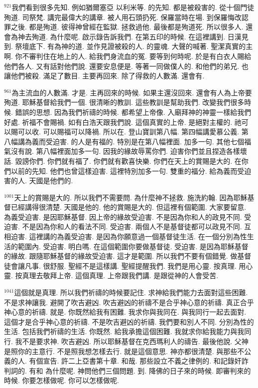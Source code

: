 \documentclass{book}
\begin{document}
$^{921}$我們看到很多先知.
例如猶爾塞亞 以利米等.
的先知.
都是被殺害的.
從十個門徒殉道.
司祭梵.
講完最偉大的講章.
被人用石頭扔死.
保羅當時在場.
到保羅悔改認罪之後.
都是殉道.
彼得神曾經在監獄.
拯救過他.
最後都是殉道死.
所以很多人.
還會為神去殉道.
為什麼呢.
啟示錄告訴我們.
在第五印的時候.
在這裡講到.
日漢見到.
祭壇底下.
有為神的道.
並作見證被殺的人.
的靈魂.
大聲的喊著.
聖潔真實的主啊.
你不審判住在地上的人.
給我們身流血的冤.
要等到何時呢.
於是有白衣人賜給他們各人.
又有話對他們說.
還要安息便是.
等著一同做僕人的.
和他們的弟兄.
也讓他們被殺.
滿足了數目.
主要再回來.
除了得救的人數滿.
還會有.

$^{961}$為主流血的人數滿.
才是.
主再回來的時候.
如果主還沒回來.
還會有人為上帝要殉道.
耶穌基督給我們一個.
很清晰的教訓.
這些教訓是幫助我們.
改變我們很多時候.
錯誤的思想.
因為我們祈禱的時候.
都希望上帝像.
入廟拜神的神靈一樣給我們好處.
祈福不會賜禍.
如有白浩天跟我們說.
這個真實的上帝.
是絕對主權的.
祂可以賜可以收.
可以賜福可以降禍.
所以在.
登山寶訓第八幅.
第四幅講愛慕公義.
第八幅講為義而受迫害.
的人是有福的.
特別是在第八幅裡面.
加多一句.
其他七個福氣沒有說.
第八幅裡面加多一句.
因我的緣故辱罵你們.
迫害你們並且捏造各樣壞話.
毀謗你們.
你們就有福了.
你們就有歡喜快樂.
你們在天上的賞賜是大的.
在你們以前的先知.
他們也曾這樣迫害.
這裡特別加多一句.
雙重的福分.
給為義而受迫害的人.
天國是他們的.

$^{1001}$天上的賞賜是大的.
所以我們不需要問.
為什麼神不拯救.
施洗約翰.
因為耶穌基督已經講得很清楚.
天國是他的.
他的賞賜是大的.
但這裡有個範圍.
大家要留意.
為義受迫害.
是因耶穌基督.
因上帝的緣故受迫害.
不是因為你和人的政見不同.
受迫害.
不是因為你和人的看法不同.
受迫害.
兩個人不是基督徒都可以政見不同.
互相迫害.
這裡講的為義受迫害.
是因為你願意過一個基督徒生活.
在一個分別為性生活的範圍內.
受迫害.
明白嗎.
在這個範圍你要做基督徒.
受迫害.
是因為耶穌基督的緣故.
跟隨耶穌基督的緣故受迫害.
這才是範圍.
所以我們不要有個錯覺.
做基督徒會讓凡事.
很舒服.
聖經不是這樣講.
聖經提醒我們.
我們是用心靈.
按真理.
用心靈.
按真理去敬拜上帝.
這個真理.
上帝跟我們講.
是跟從神的人會受苦.

$^{1041}$這個就是真理.
所以我們祈禱的時候要記住.
求神給我們能力去面對這些困難.
不是求神讓我.
避開了吹吉避凶.
吹吉避凶的祈禱不是合乎神心意的祈禱.
真正合乎神心意的祈禱.
就是.
你既然給我有困難.
我求你與我同在.
與我同行一起去面對.
這個才是合乎神心意的祈禱.
不是吹吉避凶的祈禱.
我們要和別人不同.
分別為性的生活.
包括我們祈禱的生活.
你既然.
給我承擔這個困難.
我就求你給我能力與我同行.
我不是要求神.
吹吉避凶.
所以耶穌基督在克西瑪利人的禱告.
最後他說.
父神是照你的主意行.
不是照我想怎樣去行.
就是這個意思.
神亦都很清楚.
與那些不公義的人.
有個宣告.
許二上亞書第十章.
和哉.
那些設立不義之律例的.
和記錄奸詐判詞的.
有和 為什麼呢.
神問他們三個問題.
到.
降佛的日子來的時候.
即審判來的時候.
你要怎樣做呢.
你可以怎樣做呢.
\end{document}
